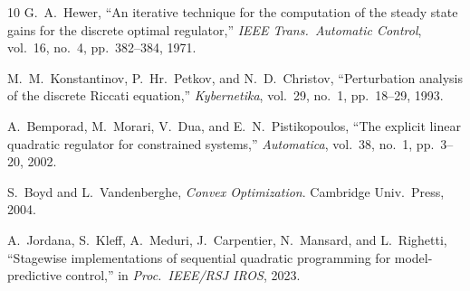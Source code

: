 \documentclass[letterpaper, 10pt, conference]{IEEEtran}
\begin{document}
\begin{thebibliography}{10}
G.~A.~Hewer,
``An iterative technique for the computation of the steady state
gains for the discrete optimal regulator,''
\emph{IEEE Trans.\ Automatic Control}, vol.~16, no.~4,
pp.~382--384, 1971.

M.~M.~Konstantinov, P.~Hr.~Petkov, and N.~D.~Christov,
``Perturbation analysis of the discrete Riccati equation,''
\emph{Kybernetika}, vol.~29, no.~1, pp.~18--29, 1993.

A.~Bemporad, M.~Morari, V.~Dua, and E.~N.~Pistikopoulos,
``The explicit linear quadratic regulator for constrained systems,''
\emph{Automatica}, vol.~38, no.~1, pp.~3--20, 2002.

S.~Boyd and L.~Vandenberghe,
\emph{Convex Optimization}.
Cambridge Univ.\ Press, 2004.

A.~Jordana, S.~Kleff, A.~Meduri, J.~Carpentier, N.~Mansard,
and L.~Righetti,
``Stagewise implementations of sequential quadratic programming
for model-predictive control,''
in \emph{Proc.\ IEEE/RSJ IROS}, 2023.

\end{thebibliography}
\end{document}
